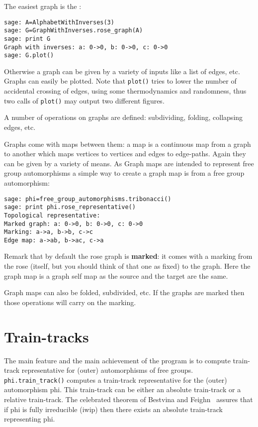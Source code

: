 \documentclass[10pt,a4paper]{article}
\begin{document}
{The easiest graph is the :
\begin{verbatim}
sage: A=AlphabetWithInverses(3)
sage: G=GraphWithInverses.rose_graph(A)
sage: print G
Graph with inverses: a: 0->0, b: 0->0, c: 0->0
sage: G.plot()
\end{verbatim}
Otherwise a graph can be given by a variety of inputs like a list of
edges, etc. Graphs can easily be plotted. Note that
\texttt{plot()} tries to lower the number of accidental crossing of
edges, using some thermodynamics and randomness, thus two calls of
\texttt{plot()} may output two different figures.

A number of operations on graphs are defined: subdividing, folding,
collapsing edges, etc.

Graphs come with maps between them: a map is a continuous map from a
graph to another which maps vertices to vertices and edges to
edge-paths. Again they can be given by a variety of means. As Graph
maps are intended to represent free group automorphisms a simple way
to create a graph map is from a free group automorphism:
\begin{verbatim}
sage: phi=free_group_automorphisms.tribonacci()
sage: print phi.rose_representative()
Topological representative:
Marked graph: a: 0->0, b: 0->0, c: 0->0
Marking: a->a, b->b, c->c
Edge map: a->ab, b->ac, c->a
\end{verbatim}
Remark that by default the rose graph is \textbf{marked}: it comes
with a marking from the rose (itself, but you should think of that one
as fixed) to the graph. Here the graph map is a graph self map as the
source and the target are the same.

Graph maps can also be folded, subdivided, etc. If the graphs are
marked then those operations will carry on the marking.

\section{Train-tracks}

The main feature and the main achievement of the program is to compute
train-track representative for (outer) automorphisms of free groups.
\texttt{phi.train\_track()} computes a train-track representative for
the (outer) automorphism phi. This train-track can be either an
absolute train-track or a relative train-track. The celebrated theorem
of Bestvina and Feighn~\cite{bf-train-track} assures that if phi is
fully irreducible (iwip) then there exists an absolute train-track
representing phi.

}
\end{document}
